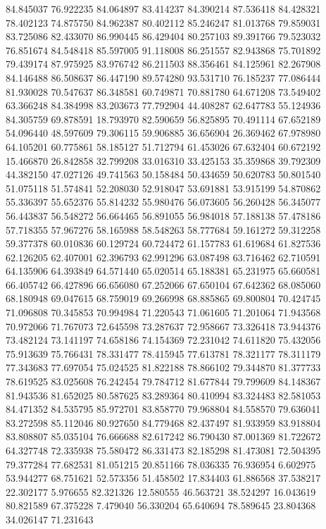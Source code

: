 84.845037
76.922235
84.064897
83.414237
84.390214
87.536418
84.428321
78.402123
74.875750
84.962387
80.402112
85.246247
81.013768
79.859031
83.725086
82.433070
86.990445
86.429404
80.257103
89.391766
79.523032
76.851674
84.548418
85.597005
91.118008
86.251557
82.943868
75.701892
79.439174
87.975925
83.976742
86.211503
88.356461
84.125961
82.267908
84.146488
86.508637
86.447190
89.574280
93.531710
76.185237
77.086444
81.930028
70.547637
86.348581
60.749871
70.881780
64.671208
73.549402
63.366248
84.384998
83.203673
77.792904
44.408287
62.647783
55.124936
84.305759
69.878591
18.793970
82.590659
56.825895
70.491114
67.652189
54.096440
48.597609
79.306115
59.906885
36.656904
26.369462
67.978980
64.105201
60.775861
58.185127
51.712794
61.453026
67.632404
60.672192
15.466870
26.842858
32.799208
33.016310
33.425153
35.359868
39.792309
44.382150
47.027126
49.741563
50.158484
50.434659
50.620783
50.801540
51.075118
51.574841
52.208030
52.918047
53.691881
53.915199
54.870862
55.336397
55.652376
55.814232
55.980476
56.073605
56.260428
56.345077
56.443837
56.548272
56.664465
56.891055
56.984018
57.188138
57.478186
57.718355
57.967276
58.165988
58.548263
58.777684
59.161272
59.312258
59.377378
60.010836
60.129724
60.724472
61.157783
61.619684
61.827536
62.126205
62.407001
62.396793
62.991296
63.087498
63.716462
62.710591
64.135906
64.393849
64.571440
65.020514
65.188381
65.231975
65.660581
66.405742
66.427896
66.656080
67.252066
67.650104
67.642362
68.085060
68.180948
69.047615
68.759019
69.266998
68.885865
69.800804
70.424745
71.096808
70.345853
70.994984
71.220543
71.061605
71.201064
71.943568
70.972066
71.767073
72.645598
73.287637
72.958667
73.326418
73.944376
73.482124
73.141197
74.658186
74.154369
72.231042
74.611820
75.432056
75.913639
75.766431
78.331477
78.415945
77.613781
78.321177
78.311179
77.343683
77.697054
75.024525
81.822188
78.866102
79.344870
81.377733
78.619525
83.025608
76.242454
79.784712
81.677844
79.799609
84.148367
81.943536
81.652025
80.587625
83.289364
80.410994
83.324483
82.581053
84.471352
84.535795
85.972701
83.858770
79.968804
84.558570
79.636041
83.272598
85.112046
80.927650
84.779468
82.437497
81.933959
83.918804
83.808807
85.035104
76.666688
82.617242
86.790430
87.001369
81.722672
64.327748
72.335938
75.580472
86.331473
82.185298
81.473081
72.504395
79.377284
77.682531
81.051215
20.851166
78.036335
76.936954
6.602975
53.944277
68.751621
52.573356
51.458502
17.834403
61.886568
37.538217
22.302177
5.976655
82.321326
12.580555
46.563721
38.524297
16.043619
80.821589
67.375228
7.479040
56.330204
65.640694
78.589645
23.804368
34.026147
71.231643
